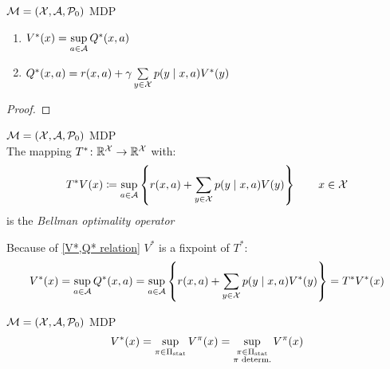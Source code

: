 \begin{lemma}\label{V*,Q* relation}\(\mathcal{M}=(\mathcal{X},\mathcal{A},\mathcal{P}_0)\) MDP
\begin{enumerate}[label=\textbf{(\roman*)},font=\normalfont]
\item \(V^*(x)=\sup\limits_{a\in\mathcal{A}}Q^*(x,a)\)
\item \(Q^*(x,a)=r(x,a)+\gamma \sum\limits_{y\in\mathcal{X}}p(y\mid x,a) V^*(y)\)
\end{enumerate}
\end{lemma}
\begin{proof}
\end{proof}
\begin{definition}\(\mathcal{M}=(\mathcal{X},\mathcal{A},\mathcal{P}_0)\) MDP\\
The mapping \(T^*\colon\mathbb{R}^{\mathcal{X}}\to\mathbb{R}^{\mathcal{X}}\) with:
	\[
	 T^* V(x)\coloneqq \sup_{a\in\mathcal{A}}\left\{r(x,a)+\sum_{y\in\mathcal{X}}p(y\mid x,a) V(y)\right\} \qquad x\in\mathcal{X}
	\]
is the \emph{Bellman optimality operator}
\end{definition}
\begin{remark}
Because of \ref{V*,Q* relation} \(V^*\) is a fixpoint of \(T^*\):
\[
	V^*(x)=\sup_{a\in\mathcal{A}}Q^*(x,a)=\sup_{a\in\mathcal{A}}\left\{r(x,a)+\sum_{y\in\mathcal{X}}p(y\mid x,a) V^*(y)\right\} =T^*V^*(x)
\]
\end{remark}
\begin{prop}\(\mathcal{M}=(\mathcal{X},\mathcal{A},\mathcal{P}_0)\) MDP
	\[V^*(x)=\sup_{\pi\in\Pi_{\textnormal{stat}}}V^\pi(x)=\sup_{\substack{
	\pi\in\Pi_{\textnormal{stat}}\\ 
	\pi\textnormal{ determ.} 
	}}V^\pi(x) \]
\end{prop}
\endinput

